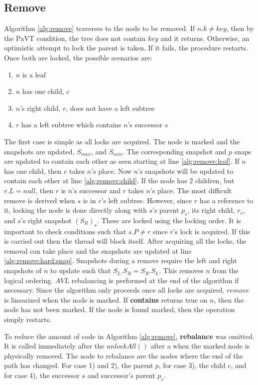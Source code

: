 \documentclass[conference]{IEEEtran}
\theoremstyle{definition}
\theoremstyle{theorem}
\begin{document}
\subsection{Remove}
Algorithm \ref{alg:remove} traverses to the node to be removed. If $n.k\neq key$, then by the PaVT condition, the tree does not contain $key$ and it returns. Otherwise, an optimistic attempt to lock the parent is taken. If it fails, the procedure restarts. Once both are locked, the possible scenarios are:
\begin{enumerate}
\item $n$ is a leaf
\item $n$ has one child, $c$
\item $n$'s right child, $r$, does not have a left subtree
\item $r$ has a left subtree which contains $n$'s successor $s$
\end{enumerate}
The first case is simple as all locks are acquired. The node is marked and the snapshots are updated, $S_{max}$, and $S_{min}$. The corresponding snapshot and $p$ snaps are updated to contain each other as seen starting at line \ref{alg:remove:leaf}. If $n$ has one child, then $c$ takes $n$'s place. Now $n$'s snapshots will be updated to contain each other at line \ref{alg:remove:child}. If the node has 2 children, but $r.L = null$, then $r$ is $n$'s successor and $r$ takes $n$'s place. The most difficult remove is derived when $s$ is in $r$'s left subtree. However, since $r$ has a reference to it, locking the node is done directly along with $s$'s parent $p_s$, its right child, $r_s$, and $s$'s right snapshot $(S_R)_s$. These are locked using the locking order. It is important to check conditions such that $s.P \neq r$ since $r$'s lock is acquired. If this is carried out then the thread will block itself. After acquiring all the locks, the removal can take place and the snapshots are updated at line \ref{alg:remove:hard:snap}. Snapshots during a remove require the left and right snapshots of $n$ to update such that $S_L.S_R = S_R.S_L$. This removes $n$ from the logical ordering. $AVL$ rebalancing is performed at the end of the algorithm if necessary. Since the algorithm only proceeds once all locks are acquired, $remove$ is linearized when the node is marked. If \textbf{contains} returns true on $n$, then the node has not been marked. If the node is found marked, then the operation simply restarts.

To reduce the amount of code in Algorithm \ref{alg:remove}, \textbf{rebalance} was omitted. It is called immediately after the $unlockAll()$ after a when the marked node is physically removed. The node to rebalance are the nodes where the end of the path has changed. For case 1) and 2), the parent $p$, for case 3), the child $c$, and for case 4), the successor $s$ and successor's parent $p_s$.
\end{document}
